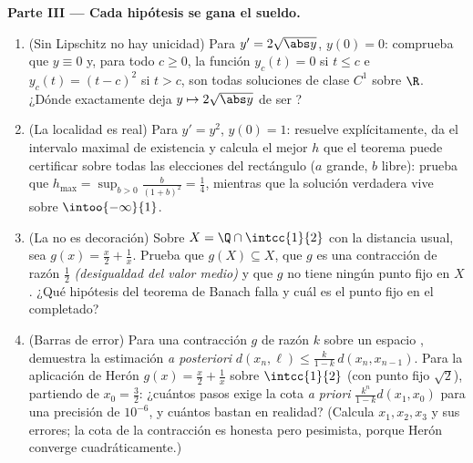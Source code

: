 \begin{problem}
\medskip
\noindent\textbf{Parte III --- Cada hipótesis se gana el sueldo.}
\begin{enumerate}[resume]
  \item (Sin Lipschitz no hay unicidad) Para $y' = 2\sqrt{\abs
        y}$, $y(0) = 0$: comprueba que $y \equiv 0$ y, para todo $c
        \geq 0$, la función $y_c(t) = 0$ si $t \leq c$ e $y_c(t) =
        (t - c)^2$ si $t > c$, son todas soluciones de clase $C^1$
        sobre $\R$. ¿Dónde exactamente deja $y \mapsto 2\sqrt{\abs
        y}$ de ser ?
  \item (La localidad es real) Para $y' = y^2$, $y(0) = 1$:
        resuelve explícitamente, da el intervalo maximal de
        existencia y calcula el mejor $h$ que el teorema puede
        certificar sobre todas las elecciones del rectángulo ($a$
        grande, $b$ libre): prueba que $h_{\max} = \sup_{b>0}
        \frac{b}{(1+b)^2} = \frac14$, mientras que la solución
        verdadera vive sobre $\intoo{-\infty}{1}$.
  \item (La  no es decoración) Sobre $X = \Q \cap
        \intcc{1}{2}$ con la distancia usual, sea $g(x) = \frac x2
        + \frac1x$. Prueba que $g(X) \subseteq X$, que $g$ es una
        contracción de razón $\frac12$ \emph{(desigualdad del valor
        medio)} y que $g$ no tiene ningún punto fijo en $X$. ¿Qué
        hipótesis del teorema de Banach falla y cuál es el punto
        fijo en el completado?
  \item (Barras de error) Para una contracción $g$ de razón $k$
        sobre un espacio , demuestra la estimación \emph{a
        posteriori} $d(x_n, \ell) \leq \frac{k}{1-k}\,d(x_n,
        x_{n-1})$. Para la aplicación de Herón $g(x) = \frac x2 +
        \frac 1x$ sobre $\intcc{1}{2}$ (con punto fijo $\sqrt2$),
        partiendo de $x_0 = \frac32$: ¿cuántos pasos exige la cota
        \emph{a priori} $\frac{k^n}{1-k}d(x_1, x_0)$ para una
        precisión de $10^{-6}$, y cuántos bastan en realidad?
        (Calcula $x_1, x_2, x_3$ y sus errores; la cota de la
        contracción es honesta pero pesimista, porque Herón converge
        cuadráticamente.)
\end{enumerate}


\end{problem}
